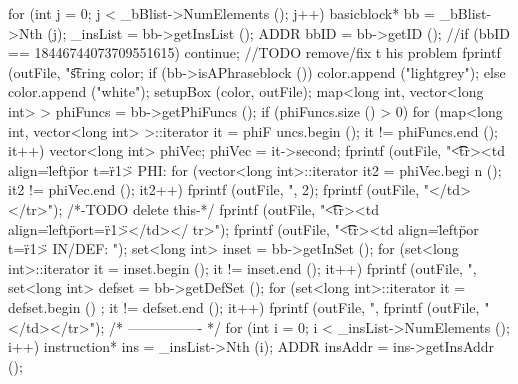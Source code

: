 \begin{DoxyCode}
                             {
        for (int j = 0; j < _bBlist->NumElements (); j++) {
        basicblock* bb = _bBlist->Nth (j);
                _insList = bb->getInsList ();
                ADDR bbID = bb->getID ();
                //if (bbID == 18446744073709551615) continue; //TODO remove/fix t
      his problem
                fprintf (outFile, "\t\"%
                string color;
                if (bb->isAPhraseblock ())  color.append ("lightgrey");
                else                        color.append ("white");     
                setupBox (color, outFile);
                map<long int, vector<long int> > phiFuncs = bb->getPhiFuncs ();
                if (phiFuncs.size () > 0) {
                        for (map<long int, vector<long int> >::iterator it = phiF
      uncs.begin (); it != phiFuncs.end (); it++) {
                                vector<long int> phiVec;
                                phiVec = it->second;
                                fprintf (outFile, "\t\t<tr><td align=\"left\" por
      t=\"r1\"> PHI: %
                                for (vector<long int>::iterator it2 = phiVec.begi
      n (); it2 != phiVec.end (); it2++) {
                                        fprintf (outFile, ",%
      2);                             
                                }
                                fprintf (outFile, "</td></tr>\n");
                        }
                }
        /*-TODO delete this-*/
                fprintf (outFile, "\t\t<tr><td align=\"left\" port=\"r1\"></td></
      tr>\n");
                                fprintf (outFile, "\t\t<tr><td align=\"left\" por
      t=\"r1\"> IN/DEF: ");                           
                set<long int> inset = bb->getInSet ();
                                for (set<long int>::iterator it = inset.begin ();
       it != inset.end (); it++) {
                                    fprintf (outFile, ",%
                                }
                set<long int> defset = bb->getDefSet ();
                                for (set<long int>::iterator it = defset.begin ()
      ; it != defset.end (); it++) {
                                    fprintf (outFile, ",%
                                }
                fprintf (outFile, "</td></tr>\n");                              
        /* ---------------- */
                for (int i = 0; i < _insList->NumElements (); i++) {
            instruction* ins = _insList->Nth (i);
                        ADDR insAddr = ins->getInsAddr ();
}}}
\end{DoxyCode}
